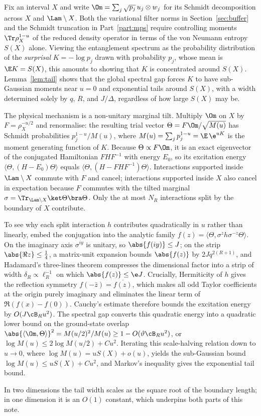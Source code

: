 \begin{inwords}
Fix an interval $X$ and write $\Om=\sum_j\sqrt{p_j}\,u_j\otimes w_j$ for
its Schmidt decomposition across $X$ and $\Lam\setminus X$. Both the
variational filter norms in Section~\ref{sec:buffer} and the Schmidt
truncation in Part~\ref{part:mps} require controlling moments
$\Tr\rho_X^{1-u}$ of the reduced density operator in terms of the von
Neumann entropy $S(X)$ alone. Viewing the entanglement spectrum as the
probability distribution of the \emph{surprisal} $K=-\log p_j$ drawn with
probability $p_j$, whose mean is $\E K=S(X)$, this amounts to showing that
$K$ is concentrated around $S(X)$. Lemma~\ref{lem:tail} shows that the
global spectral gap forces $K$ to have sub-Gaussian moments near $u=0$ and
exponential tails around $S(X)$, with a width determined solely by $q$,
$R$, and $J/\Delta$, regardless of how large $S(X)$ may be.

The physical mechanism is a non-unitary marginal tilt. Multiply $\Om$ on
$X$ by $F=\rho_X^{-u/2}$ and renormalise: the resulting trial vector
$\Theta=F\Om/\sqrt{M(u)}$ has Schmidt probabilities $p_j^{1-u}/M(u)$, where
$M(u)=\sum_jp_j^{1-u}=\E\,\e^{uK}$ is the moment generating function of
$K$. Because $\Theta\propto F\Om$, it is an exact eigenvector of the
conjugated Hamiltonian $FHF^{-1}$ with energy $E_0$, so its excitation
energy $\langle\Theta,(H-E_0)\Theta\rangle$ equals
$\langle\Theta,(H-FHF^{-1})\Theta\rangle$. Interactions supported inside
$\Lam\setminus X$ commute with $F$ and cancel; interactions supported
inside $X$ also cancel in expectation because $F$ commutes with the tilted
marginal $\sigma=\Tr_{\Lam\setminus X}\ket\Theta\bra\Theta$. Only the at
most $N_R$ interactions split by the boundary of $X$ contribute.

To see why each split interaction $h$ contributes quadratically in $u$
rather than linearly, embed the conjugation into the analytic family
$f(z)=\langle\Theta,\sigma^{z}h\sigma^{-z}\Theta\rangle$. On the imaginary
axis $\sigma^{iy}$ is unitary, so $\abs{f(iy)}\le J$; on the strip
$\abs{\Re z}\le\frac14$, a matrix-unit expansion bounds $\abs{f(z)}$ by
$2Jq^{2(R+1)}$, and Hadamard's three-lines theorem compresses the
dimensional factor into a strip of width $\delta_R\propto\ell_R^{-1}$ on
which $\abs{f(z)}\le\e J$. Crucially, Hermiticity of $h$ gives the
reflection symmetry $f(-\bar z)=\overline{f(z)}$, which makes all odd
Taylor coefficients at the origin purely imaginary and eliminates the
linear term of $\Re(f(x)-f(0))$. Cauchy's estimate therefore bounds the
excitation energy by $O(J\cB_R u^2)$. The spectral gap converts this
quadratic energy into a quadratic lower bound on the ground-state overlap
$\abs{\langle\Om,\Theta\rangle}^2=M(u/2)^2/M(u)\ge 1-O(\vartheta\cB_R u^2)$,
or $\log M(u)\le 2\log M(u/2)+Cu^2$. Iterating this scale-halving relation
down to $u\to0$, where $\log M(u)=uS(X)+o(u)$, yields the sub-Gaussian
bound $\log M(u)\le uS(X)+Cu^2$, and Markov's inequality gives the
exponential tail bound.

In two dimensions the tail width scales as the square root of the boundary
length; in one dimension it is an $O(1)$ constant, which underpins both
parts of this note.
\end{inwords}

